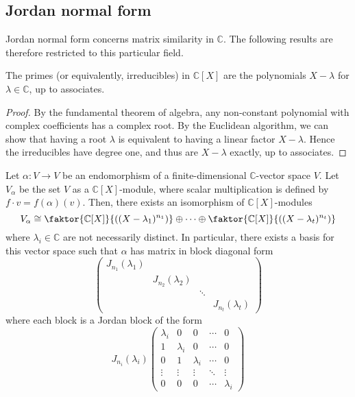\subsection{Jordan normal form}
Jordan normal form concerns matrix similarity in \( \mathbb C \).
The following results are therefore restricted to this particular field.
\begin{lemma}
	The primes (or equivalently, irreducibles) in \( \mathbb C[X] \) are the polynomials \( X - \lambda \) for \( \lambda \in \mathbb C \), up to associates.
\end{lemma}
\begin{proof}
	By the fundamental theorem of algebra, any non-constant polynomial with complex coefficients has a complex root.
	By the Euclidean algorithm, we can show that having a root \( \lambda \) is equivalent to having a linear factor \( X - \lambda \).
	Hence the irreducibles have degree one, and thus are \( X - \lambda \) exactly, up to associates.
\end{proof}
\begin{theorem}
	Let \( \alpha \colon V \to V \) be an endomorphism of a finite-dimensional \( \mathbb C \)-vector space \( V \).
	Let \( V_\alpha \) be the set \( V \) as a \( \mathbb C[X] \)-module, where scalar multiplication is defined by \( f\cdot v = f(\alpha)(v) \).
	Then, there exists an isomorphism of \( \mathbb C[X] \)-modules
	\[ V_\alpha \cong \faktor{\mathbb C[X]}{\qty((X-\lambda_1)^{n_1})} \oplus \dots \oplus \faktor{\mathbb C[X]}{\qty((X-\lambda_t)^{n_t})} \]
	where \( \lambda_i \in \mathbb C \) are not necessarily distinct.
	In particular, there exists a basis for this vector space such that \( \alpha \) has matrix in block diagonal form
	\[ \begin{pmatrix}
		J_{n_1}(\lambda_1) \\
		& J_{n_2}(\lambda_2) \\
		&& \ddots \\
		&&& J_{n_t}(\lambda_t)
	\end{pmatrix} \]
	where each block is a Jordan block of the form
	\[ J_{n_i}(\lambda_i) \begin{pmatrix}
		\lambda_i & 0 & 0 & \cdots & 0 \\
		1 & \lambda_i & 0 & \cdots & 0 \\
		0 & 1 & \lambda_i & \cdots & 0 \\
		\vdots & \vdots & \vdots & \ddots & \vdots \\
		0 & 0 & 0 & \cdots & \lambda_i
	\end{pmatrix} \]
\end{theorem}
